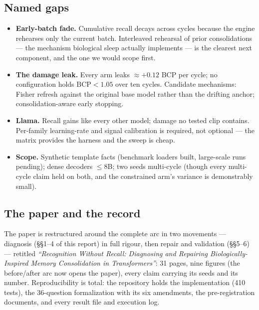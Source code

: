 \documentclass[11pt]{article}
\begin{document}
\subsection{Named gaps}

\begin{itemize}
\item \textbf{Early-batch fade.} Cumulative recall decays across cycles because the engine
      rehearses only the current batch. Interleaved rehearsal of prior consolidations --- the
      mechanism biological sleep actually implements --- is the clearest next component, and the
      one we would scope first.
\item \textbf{The damage leak.} Every arm leaks $\approx +0.12$ BCP per cycle; no configuration
      holds $\mathrm{BCP} < 1.05$ over ten cycles. Candidate mechanisms: Fisher refresh against
      the original base model rather than the drifting anchor; consolidation-aware early stopping.
\item \textbf{Llama.} Recall gains like every other model; damage no tested clip contains.
      Per-family learning-rate and signal calibration is required, not optional --- the matrix
      provides the harness and the sweep is cheap.
\item \textbf{Scope.} Synthetic template facts (benchmark loaders built, large-scale runs
      pending); dense decoders $\leq$8B; two seeds multi-cycle (though every multi-cycle claim
      held on both, and the constrained arm's variance is demonstrably small).
\end{itemize}

\subsection{The paper and the record}

The paper is restructured around the complete arc in two movements --- diagnosis
(\S\S1--4 of this report) in full rigour, then repair and validation (\S\S5--6) --- retitled
\emph{``Recognition Without Recall: Diagnosing and Repairing Biologically-Inspired Memory
Consolidation in Transformers''}: 31 pages, nine figures (the before/after arc now opens the
paper), every claim carrying its seeds and its number. Reproducibility is total: the repository
holds the implementation (410 tests), the 36-question formalization with its six amendments, the
pre-registration documents, and every result file and execution log.
\end{document}
